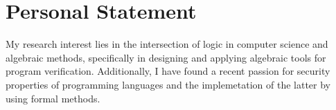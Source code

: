 \section{Personal Statement}

My research interest lies in the intersection of
logic in computer science and algebraic methods,
specifically in designing and applying algebraic tools
for program verification. Additionally, I have found a recent
passion for security properties of programming languages and
the implemetation of the latter by using formal methods.


